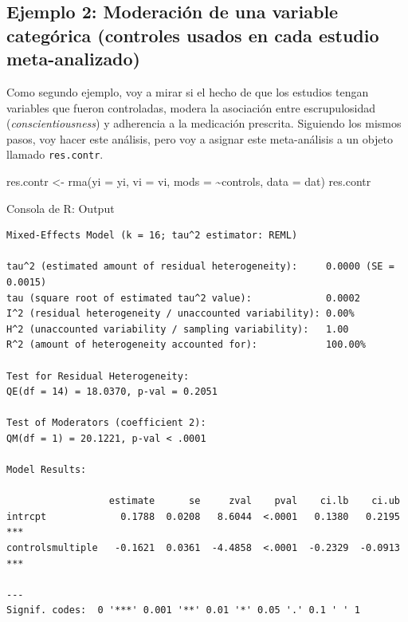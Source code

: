 \documentclass[
  bookmarksnumbered]{article}
\newenvironment{Shaded}{\begin{snugshade}}{\end{snugshade}}
\newcommand{\AttributeTok}[1]{\textcolor[rgb]{0.00,0.34,0.68}{#1}}
\newcommand{\FunctionTok}[1]{\textcolor[rgb]{0.39,0.29,0.61}{#1}}
\newcommand{\NormalTok}[1]{\textcolor[rgb]{0.12,0.11,0.11}{#1}}
\newcommand{\OtherTok}[1]{\textcolor[rgb]{0.00,0.43,0.16}{#1}}
\newcommand{\SpecialCharTok}[1]{\textcolor[rgb]{0.24,0.68,0.91}{#1}}
\begin{document}
\hypertarget{ejemplo-2-moderaciuxf3n-de-una-variable-categuxf3rica-controles-usados-en-cada-estudio-meta-analizado}{%
\subsection{Ejemplo 2: Moderación de una variable categórica (controles usados en cada estudio meta-analizado)}\label{ejemplo-2-moderaciuxf3n-de-una-variable-categuxf3rica-controles-usados-en-cada-estudio-meta-analizado}}

Como segundo ejemplo, voy a mirar si el hecho de que los estudios tengan variables que fueron controladas, modera la asociación entre escrupulosidad (\emph{conscientiousness}) y adherencia a la medicación prescrita. Siguiendo los mismos pasos, voy hacer este análisis, pero voy a asignar este meta-análisis a un objeto llamado \texttt{res.contr}.

\begin{Shaded}
\begin{Highlighting}[]
\NormalTok{res.contr }\OtherTok{\textless{}{-}} \FunctionTok{rma}\NormalTok{(}\AttributeTok{yi =}\NormalTok{ yi, }\AttributeTok{vi =}\NormalTok{ vi, }\AttributeTok{mods =} \SpecialCharTok{\textasciitilde{}}\NormalTok{controls, }\AttributeTok{data =}\NormalTok{ dat)}
\NormalTok{res.contr}
\end{Highlighting}
\end{Shaded}

\begin{ROut}{Consola de R: Output~\thetcbcounter}
                \begin{footnotesize}
                \begin{verbatim} 
Mixed-Effects Model (k = 16; tau^2 estimator: REML)

tau^2 (estimated amount of residual heterogeneity):     0.0000 (SE = 0.0015)
tau (square root of estimated tau^2 value):             0.0002
I^2 (residual heterogeneity / unaccounted variability): 0.00%
H^2 (unaccounted variability / sampling variability):   1.00
R^2 (amount of heterogeneity accounted for):            100.00%

Test for Residual Heterogeneity:
QE(df = 14) = 18.0370, p-val = 0.2051

Test of Moderators (coefficient 2):
QM(df = 1) = 20.1221, p-val < .0001

Model Results:

                  estimate      se     zval    pval    ci.lb    ci.ub      
intrcpt             0.1788  0.0208   8.6044  <.0001   0.1380   0.2195  *** 
controlsmultiple   -0.1621  0.0361  -4.4858  <.0001  -0.2329  -0.0913  *** 

---
Signif. codes:  0 '***' 0.001 '**' 0.01 '*' 0.05 '.' 0.1 ' ' 1
 \end{verbatim}
                \end{footnotesize}
                \end{ROut}
\end{document}
